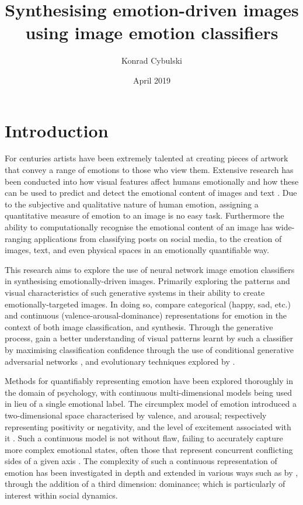 \documentclass{article}
\title{Synthesising emotion-driven images using image emotion classifiers}
\author{Konrad Cybulski}
\date{April 2019}
\begin{document}
	
\maketitle


\section{Introduction}

For centuries artists have been extremely talented at creating pieces of artwork that convey a range of emotions to those who view them.
Extensive research has been conducted into how visual features affect humans emotionally and how these can be used to predict and detect the emotional content of images and text \citep{machajdik2010affective, zhao2014exploring}.
Due to the subjective and qualitative nature of human emotion, assigning a quantitative measure of emotion to an image is no easy task.
Furthermore the ability to computationally recognise the emotional content of an image has wide-ranging applications from classifying posts on social media, to the creation of images, text, and even physical spaces in an emotionally quantifiable way.

This research aims to explore the use of neural network image emotion classifiers in synthesising emotionally-driven images.
Primarily exploring the patterns and visual characteristics of such generative systems in their ability to create emotionally-targeted images.
In doing so, compare categorical (happy, sad, etc.) and continuous (valence-arousal-dominance) representations for emotion in the context of both image classification, and synthesis.
Through the generative process, gain a better understanding of visual patterns learnt by such a classifier by maximising classification confidence through the use of conditional generative adversarial networks \citep{gauthier2014conditional}, and evolutionary techniques explored by \citep{nguyen2015deep}.

Methods for quantifiably representing emotion have been explored thoroughly in the domain of psychology, with continuous multi-dimensional models being used in lieu of a single emotional label.
The circumplex model of emotion introduced a two-dimensional space characterised by valence, and arousal; respectively representing positivity or negativity, and the level of excitement associated with it \citep{russell1980circumplex}.
Such a continuous model is not without flaw, failing to accurately capture more complex emotional states, often those that represent concurrent conflicting sides of a given axis \citep{larsen1992promises}.
The complexity of such a continuous representation of emotion has been investigated in depth and extended in various ways such as by \citet{bradley1994measuring}, through the addition of a third dimension: dominance; which is particularly of interest within social dynamics.
\end{document}
